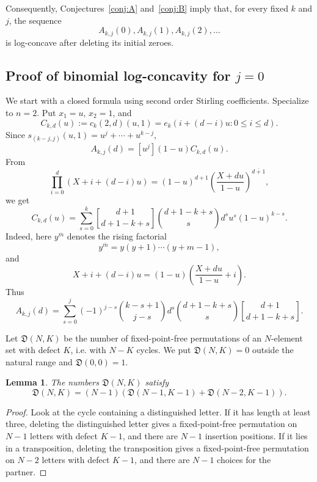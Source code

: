 \documentclass[11pt]{amsart}
\numberwithin{equation}{section}
\newtheorem{lemma}[theorem]{Lemma}
\theoremstyle{remark}
\newcommand{\Dder}{\mathfrak D}
\newcommand{\stir}[2]{\genfrac{[}{]}{0pt}{}{#1}{#2}}
\begin{document}
Consequently, Conjectures~\ref{conj:A} and~\ref{conj:B} imply that, for every fixed $k$ and $j$, the sequence
\[
  A_{k,j}(0),A_{k,j}(1),A_{k,j}(2),\ldots
\]
is log-concave after deleting its initial zeroes.

\subsection{Proof of binomial log-concavity for $j=0$}
We start with a closed formula using second order Stirling coefficients. Specialize to $n=2$.  Put $x_1=u$, $x_2=1$, and
\[
  C_{k,d}(u):=c_k(2,d)(u,1)
  =e_k(i+(d-i)u:0\le i\le d).
\]
Since $s_{(k-j,j)}(u,1)=u^j+\cdots+u^{k-j}$,
\begin{equation}\label{eq:A-extraction}
  A_{k,j}(d)=[u^j](1-u)C_{k,d}(u).
\end{equation}
From
\[
  \prod_{i=0}^{d}(X+i+(d-i)u)=
  (1-u)^{d+1}\left(\frac{X+du}{1-u}\right)^{\overline{d+1}},
\]
we get
\begin{equation}\label{eq:Ckd-stirling}
  C_{k,d}(u)=
  \sum_{s=0}^{k}
  \stir{d+1}{d+1-k+s}
  \binom{d+1-k+s}{s}d^s u^s(1-u)^{k-s}.
\end{equation}
Indeed, here $y^{\overline{m}}$ denotes the rising factorial
\[
  y^{\overline{m}}=y(y+1)\cdots(y+m-1),
\]
and
\[
  X+i+(d-i)u
  =
  (1-u)\left(\frac{X+du}{1-u}+i\right).
\]
Thus
\begin{equation}\label{eq:Akj-stirling}
  A_{k,j}(d)=
  \sum_{s=0}^{j}(-1)^{j-s}\binom{k-s+1}{j-s}d^s
  \binom{d+1-k+s}{s}
  \stir{d+1}{d+1-k+s}.
\end{equation}



Let $\Dder(N,K)$ be the number of fixed-point-free permutations of an $N$-element set with defect $K$, i.e. with $N-K$ cycles.  We put $\Dder(N,K)=0$ outside the natural range and $\Dder(0,0)=1$.

\begin{lemma}\label{lem:D-recurrence}
The numbers $\Dder(N,K)$ satisfy
\[
  \Dder(N,K)=(N-1)(\Dder(N-1,K-1)+\Dder(N-2,K-1)).
\]
\end{lemma}

\begin{proof}
Look at the cycle containing a distinguished letter.  If it has length at least three, deleting the distinguished letter gives a fixed-point-free permutation on $N-1$ letters with defect $K-1$, and there are $N-1$ insertion positions.  If it lies in a transposition, deleting the transposition gives a fixed-point-free permutation on $N-2$ letters with defect $K-1$, and there are $N-1$ choices for the partner.
\end{proof}
\end{document}

